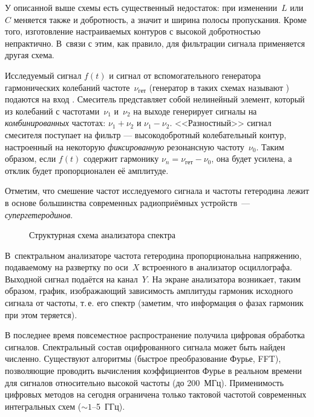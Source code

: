 \experiment

У описанной выше схемы есть существенный недостаток: при изменении~$L$ или~$C$
меняется также и добротность, а значит и ширина полосы пропускания.
Кроме того, изготовление настраиваемых контуров с высокой добротностью
непрактично. В~связи с этим, как правило, для фильтрации сигнала
применяется другая схема.

Исследуемый сигнал $f(t)$ и сигнал от вспомогательного генератора гармонических
колебаний частоте~$\nu_{гет}$ (генератор в таких схемах называют
) подаются на вход . Смеситель
представляет собой нелинейный элемент, который из колебаний с частотами~$\nu_1$
и~$\nu_2$ на выходе генерирует сигналы на \emph{комбинированных}
частотах: $\nu_1 + \nu_2$ и $\nu_1 - \nu_2$.
<<Разностный>> сигнал смесителя поступает на фильтр ---
высокодобротный колебательный контур, настроенный на некоторую \emph{фиксированную}
резонансную частоту~$\nu_0$. Таким образом, если $f(t)$ содержит гармонику
$\nu_n=\nu_{гет}-\nu_0$, она будет усилена, а отклик будет
пропорционален её амплитуде.

Отметим, что смешение частот исследуемого сигнала и частоты гетеродина лежит в
основе большинства современных радиоприёмных устройств~---
\emph{супергетеродинов}.

\begin{figure}[h!]
\hfil
{}
\caption{Структурная схема анализатора спектра}
\end{figure}

В~спектральном анализаторе частота гетеродина пропорциональна напряжению,
подаваемому на развертку по оси~$X$ встроенного в анализатор осциллографа.
Выходной сигнал подаётся на канал~$Y$. На экране анализатора возникает, таким
образом, график, изображающий зависимость амплитуды гармоник исходного сигнала
от частоты, т.\,е. его спектр (заметим, что информация о фазах гармоник при этом
теряется).

В последнее время повсеместное распространение получила цифровая обработка
сигналов. Спектральный состав оцифрованного сигнала может быть найден численно.
Существуют алгоритмы (быстрое преобразование Фурье, FFT), позволяющие проводить
вычисления коэффициентов Фурье в реальном времени для сигналов относительно
высокой частоты (до 200~МГц). Применимость цифровых методов на сегодня
ограничена только тактовой частотой современных интегральных схем ($\sim1$--5~ГГц).

